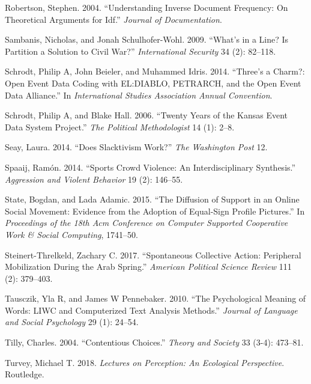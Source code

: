 \documentclass[
  english,
  man]{apa6}
\begin{document}
\leavevmode\hypertarget{ref-robertson2004understanding}{}%
Robertson, Stephen. 2004. ``Understanding Inverse Document Frequency: On Theoretical Arguments for Idf.'' \emph{Journal of Documentation}.

\leavevmode\hypertarget{ref-sambanis2009s}{}%
Sambanis, Nicholas, and Jonah Schulhofer-Wohl. 2009. ``What's in a Line? Is Partition a Solution to Civil War?'' \emph{International Security} 34 (2): 82--118.

\leavevmode\hypertarget{ref-schrodt2014three}{}%
Schrodt, Philip A, John Beieler, and Muhammed Idris. 2014. ``Three's a Charm?: Open Event Data Coding with EL:DIABLO, PETRARCH, and the Open Event Data Alliance.'' In \emph{International Studies Association Annual Convention}.

\leavevmode\hypertarget{ref-schrodt2006twenty}{}%
Schrodt, Philip A, and Blake Hall. 2006. ``Twenty Years of the Kansas Event Data System Project.'' \emph{The Political Methodologist} 14 (1): 2--8.

\leavevmode\hypertarget{ref-seay2014slacktivism}{}%
Seay, Laura. 2014. ``Does Slacktivism Work?'' \emph{The Washington Post} 12.

\leavevmode\hypertarget{ref-spaaij2014sports}{}%
Spaaij, Ramón. 2014. ``Sports Crowd Violence: An Interdisciplinary Synthesis.'' \emph{Aggression and Violent Behavior} 19 (2): 146--55.

\leavevmode\hypertarget{ref-state2015diffusion}{}%
State, Bogdan, and Lada Adamic. 2015. ``The Diffusion of Support in an Online Social Movement: Evidence from the Adoption of Equal-Sign Profile Pictures.'' In \emph{Proceedings of the 18th Acm Conference on Computer Supported Cooperative Work \& Social Computing}, 1741--50.

\leavevmode\hypertarget{ref-steinert2017spontaneous}{}%
Steinert-Threlkeld, Zachary C. 2017. ``Spontaneous Collective Action: Peripheral Mobilization During the Arab Spring.'' \emph{American Political Science Review} 111 (2): 379--403.

\leavevmode\hypertarget{ref-tausczik2010psychological}{}%
Tausczik, Yla R, and James W Pennebaker. 2010. ``The Psychological Meaning of Words: LIWC and Computerized Text Analysis Methods.'' \emph{Journal of Language and Social Psychology} 29 (1): 24--54.

\leavevmode\hypertarget{ref-tilly2004contentious}{}%
Tilly, Charles. 2004. ``Contentious Choices.'' \emph{Theory and Society} 33 (3-4): 473--81.

\leavevmode\hypertarget{ref-turvey2018lectures}{}%
Turvey, Michael T. 2018. \emph{Lectures on Perception: An Ecological Perspective}. Routledge.
\end{document}
